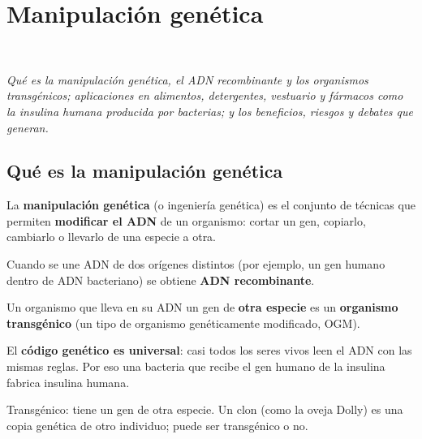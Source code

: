 \section[Manipulación genética]{Manipulación genética}
\modcomun\ \ {\color{gris}\itshape Qué es la manipulación genética, el ADN recombinante y los organismos transgénicos; aplicaciones en alimentos, detergentes, vestuario y fármacos como la insulina humana producida por bacterias; y los beneficios, riesgos y debates que generan.\par}
\subsection{Qué es la manipulación genética}
La \textbf{manipulación genética} (o ingeniería genética) es el conjunto de técnicas que permiten \textbf{modificar el ADN} de un organismo: cortar un gen, copiarlo, cambiarlo o llevarlo de una especie a otra.

 

Cuando se une ADN de dos orígenes distintos (por ejemplo, un gen humano dentro de ADN bacteriano) se obtiene \textbf{ADN recombinante}.

 

Un organismo que lleva en su ADN un gen de \textbf{otra especie} es un \textbf{organismo transgénico} (un tipo de organismo genéticamente modificado, OGM).

  
\begin{clave} El \textbf{código genético es universal}: casi todos los seres vivos leen el ADN con las mismas reglas. Por eso una bacteria que recibe el gen humano de la insulina fabrica insulina humana.\end{clave}
 
\begin{clave}[{Recuerda}] Transgénico: tiene un gen de otra especie. Un clon (como la oveja Dolly) es una copia genética de otro individuo; puede ser transgénico o no.\end{clave}
